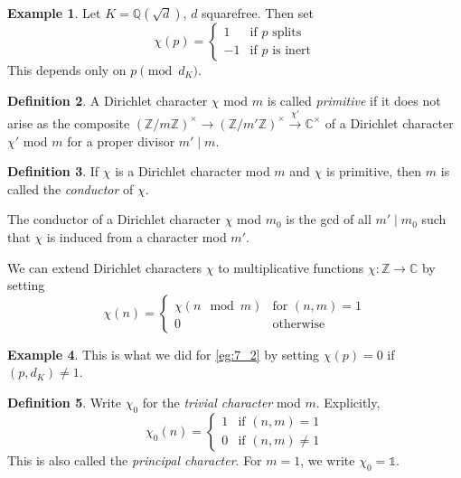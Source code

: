 \documentclass[11pt]{article}
\theoremstyle{definition}
\newtheorem{definition}{Definition}[section]
\newtheorem{example}[definition]{Example}
\theoremstyle{plain}
\theoremstyle{remark}
\newcommand{\ZZ}{\mathbb{Z}}
\newcommand{\QQ}{\mathbb{Q}}
\newcommand{\CC}{\mathbb{C}}
\begin{document}
\begin{example}\label{eg:7_2}
    Let $K = \QQ(\sqrt{d})$, $d$ squarefree. Then set
    \begin{equation*}
        \chi(p) = \begin{cases}
            1 & \text{if } p \text{ splits}\\
            -1 & \text{if } p \text{ is inert}
        \end{cases}
    \end{equation*}
    This depends only on $p \pmod{d_K}$.
\end{example}

\begin{definition}\label{def:7_3}
    A Dirichlet character $\chi$ mod $m$ is called \emph{primitive} if it does not arise as the composite $(\ZZ/m\ZZ)^\times \to (\ZZ/m'\ZZ)^\times \xrightarrow{\chi'} \CC^\times$ of a Dirichlet character $\chi'$ mod $m$ for a proper divisor $m' \mid m$.
\end{definition}

\begin{definition}\label{def:7_4}
    If $\chi$ is a Dirichlet character mod $m$ and $\chi$ is primitive, then $m$ is called the \emph{conductor} of $\chi$.
\end{definition}

The conductor of a Dirichlet character $\chi$ mod $m_0$ is the gcd of all $m' \mid m_0$ such that $\chi$ is induced from a character mod $m'$.

We can extend Dirichlet characters $\chi$ to multiplicative functions $\chi : \ZZ \to \CC$ by setting
\begin{equation*}
    \chi(n) =
    \begin{cases}
        \chi(n \mod{m}) & \text{for } (n, m) = 1\\
        0 & \text{otherwise}
    \end{cases}
\end{equation*}


\begin{example}\label{eg:7_6}
    This is what we did for \autoref{eg:7_2} by setting $\chi(p) = 0$ if $(p, d_K) \neq 1$.
\end{example}

\begin{definition}\label{def:7_7}
    Write $\chi_0$ for the \emph{trivial character} mod $m$. Explicitly,
    \begin{equation*}
        \chi_0(n) =
        \begin{cases}
            1 & \text{if } (n, m) = 1\\
            0 & \text{if } (n, m) \neq 1
        \end{cases}
    \end{equation*}
    This is also called the \emph{principal character}.
    For $m = 1$, we write $\chi_0 = \mathbb{1}$.
\end{definition}
\end{document}
